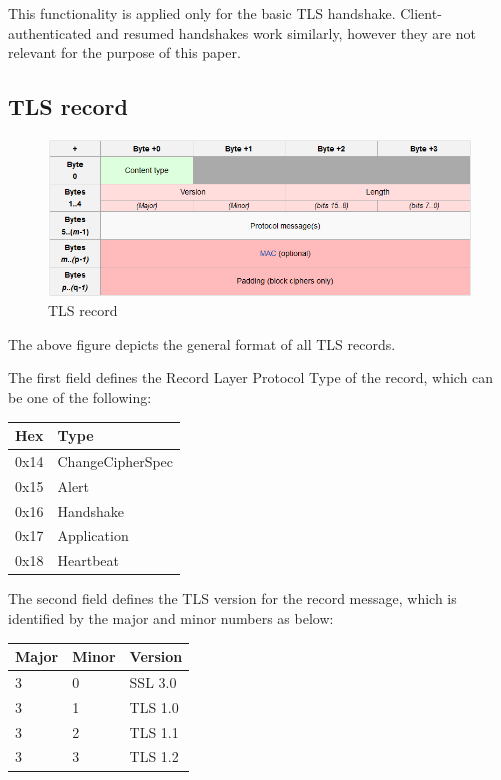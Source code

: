 This functionality is applied only for the basic TLS handshake.
Client-authenticated and resumed handshakes work similarly, however they are not
relevant for the purpose of this paper.

\subsection{TLS record}

\begin{figure}[H] \caption{TLS record} \centering
\includegraphics[width=1\textwidth]{diagrams/tls_record.png}\end{figure}

The above figure depicts the general format of all TLS records.

The first field defines the Record Layer Protocol Type of the record, which can
be one of the following:

\begin{table}[H] \centering \begin{tabular}{ | l | l | } \hline \textbf{Hex} &
\textbf{Type} \\ \hline 0x14 & ChangeCipherSpec \\ 0x15 & Alert \\ 0x16 &
Handshake \\ 0x17 & Application \\ 0x18 & Heartbeat \\ \hline \end{tabular}
\end{table}

The second field defines the TLS version for the record message, which is
identified by the major and minor numbers as below:

\begin{table}[H] \centering \begin{tabular}{ | l | l | l | } \hline
\textbf{Major} & \textbf{Minor} & \textbf{Version} \\ \hline 3 & 0 & SSL 3.0 \\
3 & 1 & TLS 1.0 \\ 3 & 2 & TLS 1.1 \\ 3 & 3 & TLS 1.2 \\ \hline \end{tabular}
\end{table}

